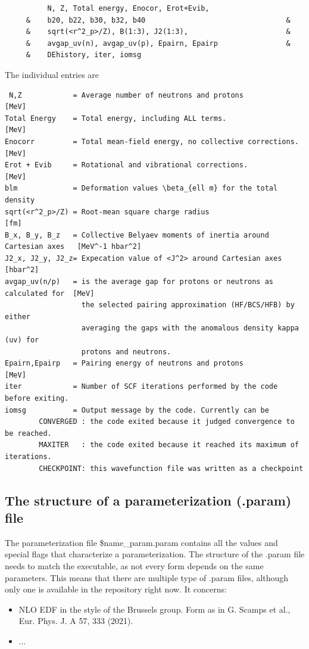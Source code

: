 \documentclass[print,amsmath,amssymb,aps,prc,nofootinbib,notitlepage]{revtex4-1}
\begin{document}
\begin{Verbatim}
          N, Z, Total energy, Enocor, Erot+Evib,  
     &    b20, b22, b30, b32, b40                                 &
     &    sqrt(<r^2_p>/Z), B(1:3), J2(1:3),                       &
     &    avgap_uv(n), avgap_uv(p), Epairn, Epairp                &
     &    DEhistory, iter, iomsg
\end{Verbatim}

The individual entries are

\begin{Verbatim}
 N,Z            = Average number of neutrons and protons                        [MeV]
Total Energy    = Total energy, including ALL terms.                            [MeV]
Enocorr         = Total mean-field energy, no collective corrections.           [MeV]
Erot + Evib     = Rotational and vibrational corrections.                       [MeV]
blm             = Deformation values \beta_{ell m} for the total density
sqrt(<r^2_p>/Z) = Root-mean square charge radius                                [fm]
B_x, B_y, B_z   = Collective Belyaev moments of inertia around Cartesian axes   [MeV^-1 hbar^2] 
J2_x, J2_y, J2_z= Expecation value of <J^2> around Cartesian axes               [hbar^2]
avgap_uv(n/p)   = is the average gap for protons or neutrons as calculated for  [MeV]
                  the selected pairing approximation (HF/BCS/HFB) by either 
                  averaging the gaps with the anomalous density kappa (uv) for 
                  protons and neutrons.
Epairn,Epairp   = Pairing energy of neutrons and protons                        [MeV]            
iter            = Number of SCF iterations performed by the code before exiting. 
iomsg           = Output message by the code. Currently can be 
        CONVERGED : the code exited because it judged convergence to be reached.
        MAXITER   : the code exited because it reached its maximum of iterations.
        CHECKPOINT: this wavefunction file was written as a checkpoint
\end{Verbatim}

\subsection{The structure of a parameterization (.param) file }
\label{sec:param}

The parameterization file \${name\_param}.param contains all the values and 
special flags that characterize a parameterization. The structure of the .param
file needs to match the executable, as not every form depends on the same 
parameters. This means that there are multiple type of .param files, although only one
is available in the repository right now. It concerns: 
\begin{itemize}
\item NLO EDF in the style of the Brussels group.
      Form as in G. Scamps et al., Eur. Phys. J. A 57, 333 (2021). 
\item ...
\end{itemize}
\end{document}
